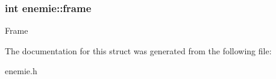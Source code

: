 \subsubsection[{\texorpdfstring{frame}{frame}}]{\setlength{\rightskip}{0pt plus 5cm}int enemie\+::frame}\hypertarget{structenemie_af24b4c2739f5ae830d397c0d13ace987}{}\label{structenemie_af24b4c2739f5ae830d397c0d13ace987}
Frame 

The documentation for this struct was generated from the following file\+:\begin{DoxyCompactItemize}
\item 
enemie.\+h\end{DoxyCompactItemize}
